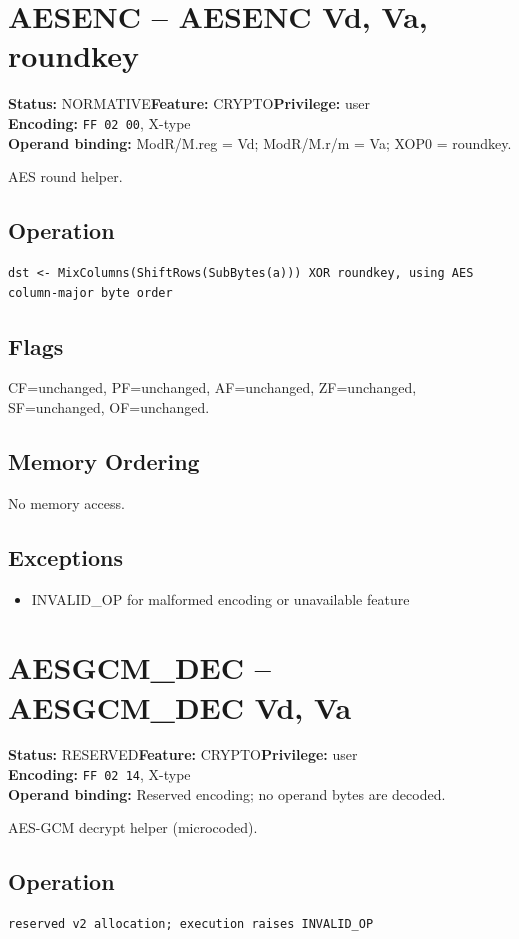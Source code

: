 \documentclass[10pt]{article}
\begin{document}
\section{AESENC -- AESENC Vd, Va, roundkey}
\textbf{Status:} NORMATIVE\quad \textbf{Feature:} CRYPTO\quad \textbf{Privilege:} user\\
\textbf{Encoding:} \texttt{FF 02 00}, X-type\\
\textbf{Operand binding:} ModR/M.reg = Vd; ModR/M.r/m = Va; XOP0 = roundkey.

AES round helper.

\subsection*{Operation}
\begin{lstlisting}
dst <- MixColumns(ShiftRows(SubBytes(a))) XOR roundkey, using AES column-major byte order
\end{lstlisting}
\subsection*{Flags}
CF=unchanged, PF=unchanged, AF=unchanged, ZF=unchanged, SF=unchanged, OF=unchanged.
\subsection*{Memory Ordering}
No memory access.
\subsection*{Exceptions}
\begin{itemize}
\item INVALID\_OP for malformed encoding or unavailable feature
\end{itemize}
\clearpage

\section{AESGCM\_DEC -- AESGCM\_DEC Vd, Va}
\textbf{Status:} RESERVED\quad \textbf{Feature:} CRYPTO\quad \textbf{Privilege:} user\\
\textbf{Encoding:} \texttt{FF 02 14}, X-type\\
\textbf{Operand binding:} Reserved encoding; no operand bytes are decoded.

AES-GCM decrypt helper (microcoded).

\subsection*{Operation}
\begin{lstlisting}
reserved v2 allocation; execution raises INVALID_OP
\end{lstlisting}
\end{document}
